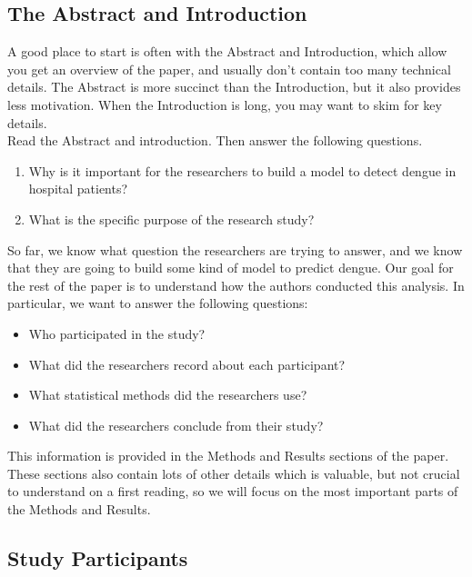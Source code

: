 \documentclass[11pt]{article}
\begin{document}
\subsection*{The Abstract and Introduction}

A good place to start is often with the Abstract and Introduction, which allow you get an overview of the paper, and usually don't contain too many technical details. The Abstract is more succinct than the Introduction, but it also provides less motivation. When the Introduction is long, you may want to skim for key details.\\

\noindent Read the Abstract and introduction. Then answer the following questions.

\begin{enumerate}
    \item Why is it important for the researchers to build a model to detect dengue in hospital patients?
    
    \item What is the specific purpose of the research study?
\end{enumerate}

\noindent So far, we know what question the researchers are trying to answer, and we know that they are going to build some kind of model to predict dengue. Our goal for the rest of the paper is to understand how the authors conducted this analysis. In particular, we want to answer the following questions:

\begin{itemize}
\item Who participated in the study?
\item What did the researchers record about each participant?
\item What statistical methods did the researchers use?
\item What did the researchers conclude from their study?
\end{itemize}

\noindent This information is provided in the Methods and Results sections of the paper. These sections also contain lots of other details which is valuable, but not crucial to understand on a first reading, so we will focus on the most important parts of the Methods and Results.

\subsection*{Study Participants}
\end{document}
